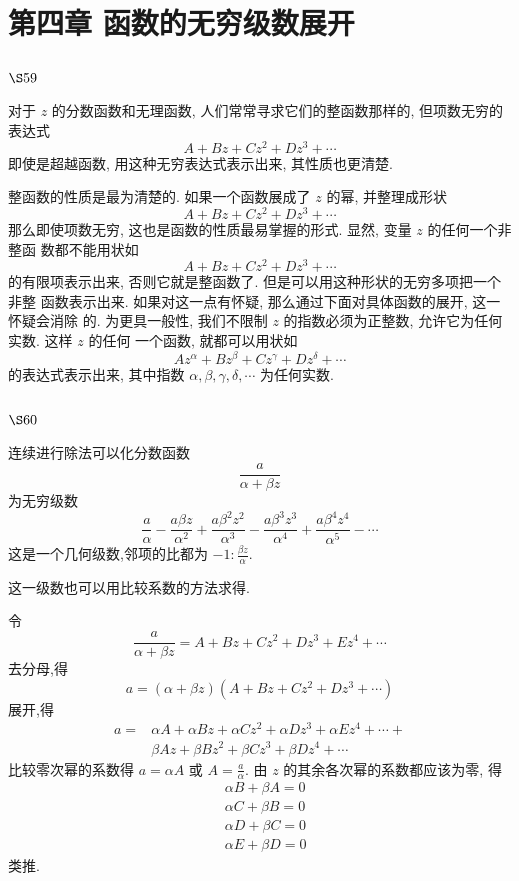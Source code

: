 \chapter{第四章 函数的无穷级数展开}

\section{$\S 59$}

对于 $z$ 的分数函数和无理函数, 人们常常寻求它们的整函数那样的, 但项数无穷的 表达式
\[
A+B z+C z^{2}+D z^{3}+\cdots
\]
即使是超越函数, 用这种无穷表达式表示出来, 其性质也更清楚.

整函数的性质是最为清楚的. 如果一个函数展成了 $z$ 的幂, 并整理成形状
\[
A+B z+C z^{2}+D z^{3}+\cdots
\]
那么即使项数无穷, 这也是函数的性质最易掌握的形式. 显然, 变量 $z$ 的任何一个非整函 数都不能用状如
\[
A+B z+C z^{2}+D z^{3}+\cdots
\]
的有限项表示出来, 否则它就是整函数了. 但是可以用这种形状的无穷多项把一个非整 函数表示出来. 如果对这一点有怀疑, 那么通过下面对具体函数的展开, 这一怀疑会消除 的. 为更具一般性, 我们不限制 $z$ 的指数必须为正整数, 允许它为任何实数. 这样 $z$ 的任何 一个函数, 就都可以用状如
\[
A z^{\alpha}+B z^{\beta}+C z^{\gamma}+D z^{\delta}+\cdots
\]
的表达式表示出来, 其中指数 $\alpha, \beta, \gamma, \delta, \cdots$ 为任何实数.

\section{$\S 60$}

连续进行除法可以化分数函数
\[
\frac{a}{\alpha+\beta z}
\]
为无穷级数
\[
\frac{a}{\alpha}-\frac{a \beta z}{\alpha^{2}}+\frac{a \beta^{2} z^{2}}{\alpha^{3}}-\frac{a \beta^{3} z^{3}}{\alpha^{4}}+\frac{a \beta^{4} z^{4}}{\alpha^{5}}-\cdots
\]
这是一个几何级数,邻项的比都为 $-1: \frac{\beta z}{\alpha}$.

这一级数也可以用比较系数的方法求得. 

令
\[
\frac{a}{\alpha+\beta z}=A+B z+C z^{2}+D z^{3}+E z^{4}+\cdots
\]
去分母,得
\[
a=(\alpha+\beta z)\left(A+B z+C z^{2}+D z^{3}+\cdots\right)
\]
展开,得
\[
\begin{aligned}
a= & \alpha A+\alpha B z+\alpha C z^{2}+\alpha D z^{3}+\alpha E z^{4}+\cdots+ \\
& \beta A z+\beta B z^{2}+\beta C z^{3}+\beta D z^{4}+\cdots
\end{aligned}
\]
比较零次幂的系数得 $a=\alpha A$ 或 $A=\frac{a}{\alpha}$. 由 $z$ 的其余各次幂的系数都应该为零, 得
\[
\begin{aligned}
& \alpha B+\beta A=0 \\
& \alpha C+\beta B=0 \\
& \alpha D+\beta C=0 \\
& \alpha E+\beta D=0
\end{aligned}
\]
类推.


